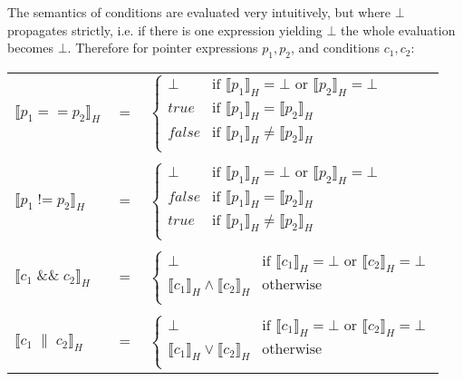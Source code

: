 	The semantics of conditions are evaluated very intuitively, but where $\bot$
	propagates strictly, i.e. if there is one expression yielding $\bot$ the
	whole evaluation becomes $\bot$. Therefore for pointer expressions
	$p_1,p_2$, and conditions $c_1, c_2$:
	\begin{center}
		\begin{tabular}{lcl}
			$\llbracket p_1 == p_2\rrbracket_H$ & $=$ & $
			\begin{cases}
				\bot &\text{if } \llbracket p_1\rrbracket_H = \bot \text{ or }
					\llbracket p_2\rrbracket_H = \bot \\
				\mathit{true} &\text{if } \llbracket p_1\rrbracket_H =\llbracket
					p_2\rrbracket_H\\
				\mathit{false} &\text{if } \llbracket p_1\rrbracket_H
					\neq\llbracket p_2\rrbracket_H \\
			\end{cases}$\\
			\\
			$\llbracket p_1\;\text{!=}\; p_2\rrbracket_H$ & $=$ & $
			\begin{cases}
				\bot &\text{if } \llbracket p_1\rrbracket_H = \bot \text{ or }
					\llbracket p_2\rrbracket_H = \bot \\
				\mathit{false} &\text{if } \llbracket p_1\rrbracket_H=\llbracket
					p_2\rrbracket_H\\
				\mathit{true} &\text{if } \llbracket p_1\rrbracket_H
					\neq\llbracket p_2\rrbracket_H \\
			\end{cases}$\\
			\\
			$\llbracket c_1\;\&\&\; c_2\rrbracket_H$ & $=$ &
				$\begin{cases}
					\bot &\text{if } \llbracket c_1\rrbracket_H = \bot \text{ or }
					\llbracket c_2\rrbracket_H = \bot\\
					\llbracket c_1\rrbracket_H\land\llbracket c_2\rrbracket_H &
					\text{otherwise}\\
				\end{cases}
					$\\
			\\
			$\llbracket c_1 \;\|\; c_2\rrbracket_H$ & $=$ &
				$\begin{cases}
					\bot&\text{if }\llbracket c_1\rrbracket_H =\bot\text{ or }
				\llbracket c_2\rrbracket_H=\bot\\
					\llbracket c_1\rrbracket_H\lor \llbracket c_2\rrbracket_H
					&\text{otherwise}\\
				\end{cases}$\\
		\end{tabular}
	\end{center}
